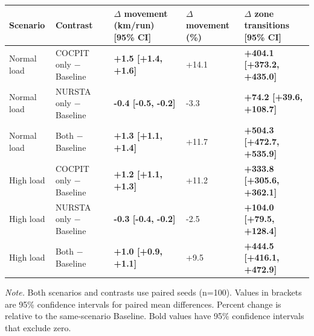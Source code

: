\begin{tabular}{lllll}
\toprule
\textbf{Scenario} & \textbf{Contrast} & \textbf{\ensuremath{\Delta} movement (km/run) [95\% CI]} & \textbf{\ensuremath{\Delta} movement (\%)} & \textbf{\ensuremath{\Delta} zone transitions [95\% CI]} \\
\midrule
Normal load & COCPIT only \ensuremath{-} Baseline & \textbf{+1.5 [+1.4, +1.6]} & +14.1 & \textbf{+404.1 [+373.2, +435.0]} \\
Normal load & NURSTA only \ensuremath{-} Baseline & \textbf{-0.4 [-0.5, -0.2]} & -3.3 & \textbf{+74.2 [+39.6, +108.7]} \\
Normal load & Both \ensuremath{-} Baseline & \textbf{+1.3 [+1.1, +1.4]} & +11.7 & \textbf{+504.3 [+472.7, +535.9]} \\
\addlinespace[2pt]
High load & COCPIT only \ensuremath{-} Baseline & \textbf{+1.2 [+1.1, +1.3]} & +11.2 & \textbf{+333.8 [+305.6, +362.1]} \\
High load & NURSTA only \ensuremath{-} Baseline & \textbf{-0.3 [-0.4, -0.2]} & -2.5 & \textbf{+104.0 [+79.5, +128.4]} \\
High load & Both \ensuremath{-} Baseline & \textbf{+1.0 [+0.9, +1.1]} & +9.5 & \textbf{+444.5 [+416.1, +472.9]} \\
\bottomrule
\end{tabular}

\par\footnotesize\textit{Note.} Both scenarios and contrasts use paired seeds (n=100). Values in brackets are 95\% confidence intervals for paired mean differences. Percent change is relative to the same-scenario Baseline. Bold values have 95\% confidence intervals that exclude zero.
